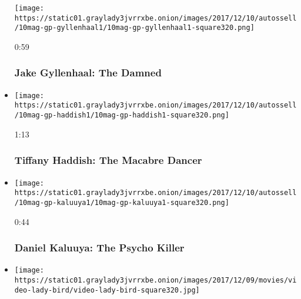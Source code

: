 \begin{itemize}
  \texttt{[image: https://static01.graylady3jvrrxbe.onion/images/2017/12/10/autossell/10mag-gp-gyllenhaal1/10mag-gp-gyllenhaal1-square320.png]}

  0:59

  \hypertarget{jake-gyllenhaal-the-damned}{%
  \subsubsection{Jake Gyllenhaal: The
  Damned}\label{jake-gyllenhaal-the-damned}}
\item
  \href{https://www.nytimes3xbfgragh.onion/video/magazine/100000005588881/tiffany-haddish-the-macabre-dancer.html?action=click\&module=video-series-bar\&region=header\&pgtype=Article\&playlistId=video/magazine}{}

  \texttt{[image: https://static01.graylady3jvrrxbe.onion/images/2017/12/10/autossell/10mag-gp-haddish1/10mag-gp-haddish1-square320.png]}

  1:13

  \hypertarget{tiffany-haddish-the-macabre-dancer}{%
  \subsubsection{Tiffany Haddish: The Macabre
  Dancer}\label{tiffany-haddish-the-macabre-dancer}}
\item
  \href{https://www.nytimes3xbfgragh.onion/video/magazine/100000005588890/daniel-kaluuya-the-psycho-killer.html?action=click\&module=video-series-bar\&region=header\&pgtype=Article\&playlistId=video/magazine}{}

  \texttt{[image: https://static01.graylady3jvrrxbe.onion/images/2017/12/10/autossell/10mag-gp-kaluuya1/10mag-gp-kaluuya1-square320.png]}

  0:44

  \hypertarget{daniel-kaluuya-the-psycho-killer}{%
  \subsubsection{Daniel Kaluuya: The Psycho
  Killer}\label{daniel-kaluuya-the-psycho-killer}}
\item
  \href{https://www.nytimes3xbfgragh.onion/video/magazine/100000005555132/the-10-great-performers-of-2017-and-why-we-chose-them.html?action=click\&module=video-series-bar\&region=header\&pgtype=Article\&playlistId=video/magazine}{}

  \texttt{[image: https://static01.graylady3jvrrxbe.onion/images/2017/12/09/movies/video-lady-bird/video-lady-bird-square320.jpg]}


\end{itemize}
